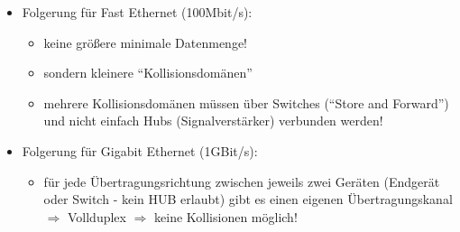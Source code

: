 \begin{description}
\begin{itemize}
\item Folgerung für Fast Ethernet (100Mbit/s):
\begin{itemize}
\item[]keine größere minimale Datenmenge!
\item[]sondern kleinere “Kollisionsdomänen”
\item[]mehrere Kollisionsdomänen müssen über Switches (“Store and Forward”) und nicht einfach Hubs (Signalverstärker) verbunden werden!
\end{itemize}

\item Folgerung für Gigabit Ethernet (1GBit/s):
\begin{itemize}
\item[]für jede Übertragungsrichtung zwischen jeweils zwei Geräten (Endgerät oder Switch -  kein HUB erlaubt) gibt es einen eigenen Übertragungskanal $\Rightarrow$ Vollduplex $\Rightarrow$ keine Kollisionen möglich!
\end{itemize}
\end{itemize}

\end{description}